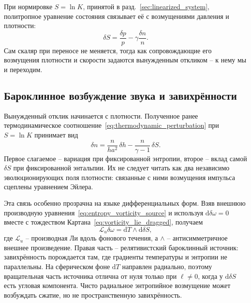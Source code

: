 \documentclass[12pt,a4paper,preprint,nopreprintline]{elsarticle}
\begin{document}
При нормировке $S=\ln K$, принятой в разд.~\ref{sec:linearized_system}, политропное уравнение состояния связывает её с возмущениями давления и плотности:
\begin{equation}
    \delta S
    =
    \frac{\delta p}{p}
    -
    \gamma\frac{\delta n}{n}.
    \label{eq:entropy_thermodynamic_definition}
\end{equation}
Сам скаляр при переносе не меняется, тогда как сопровождающие его возмущения плотности и скорости задаются вынужденным откликом -- к нему мы и переходим.

\subsection{Бароклинное возбуждение звука и завихрённости}
\label{sec:mode_coupling}

Вынужденный отклик начинается с плотности. Полученное ранее термодинамическое соотношение~\eqref{eq:thermodynamic_perturbation} при $S=\ln K$ принимает вид
\begin{equation}
    \delta n
    =
    \frac{n}{ha^{2}}\,\delta h
    -
    \frac{n}{\gamma-1}\,\delta S.
    \label{eq:entropy_density_split}
\end{equation}
Первое слагаемое -- вариация при фиксированной энтропии, второе -- вклад самой $\delta S$ при фиксированной энтальпии. Их не следует читать как два независимо эволюционирующих поля плотности: связанные с ними возмущения импульса сцеплены уравнением Эйлера.

Эта связь особенно прозрачна на языке дифференциальных форм. Взяв внешнюю производную уравнения~\eqref{eq:entropy_vorticity_source} и используя $\mathrm{d}\delta\omega=0$ вместе с тождеством Картана~\eqref{eq:vorticity_lie_dragged}, получаем
\begin{equation}
    \mathcal{L}_{u}\delta\omega
    =
    \mathrm{d}T\wedge\mathrm{d}\delta S,
    \label{eq:entropy_baroclinic_vorticity}
\end{equation}
где $\mathcal{L}_{u}$ -- производная Ли вдоль фонового течения, а $\wedge$ -- антисимметричное внешнее произведение. Правая часть -- релятивистский бароклинный источник: завихрённость порождается там, где градиенты температуры и энтропии не параллельны. На сферическом фоне $\mathrm{d}T$ направлен радиально, поэтому вращательная часть источника отлична от нуля только при $\ell\neq0$, когда у $\mathrm{d}\delta S$ есть угловая компонента. Чисто радиальное энтропийное возмущение может возбуждать сжатие, но не пространственную завихрённость.
\end{document}
